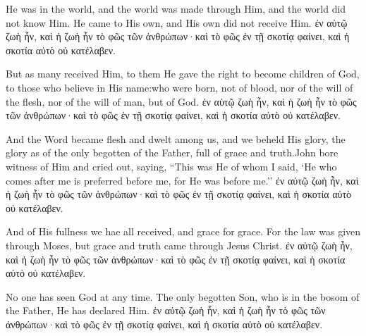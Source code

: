 \newpage

\begin{paracol}{2}
    He was in the world, and the world was made through Him, and the world did not know Him.
    He came to His own, and His own did not receive Him.
\switchcolumn
 ἐν αὐτῷ ζωὴ ἦν, καὶ ἡ ζωὴ ἦν τὸ φῶς τῶν ἀνθρώπων·καὶ τὸ φῶς ἐν τῇ σκοτίᾳ φαίνει, καὶ ἡ σκοτία αὐτὸ οὐ κατέλαβεν.
\end{paracol}

\newpage

\begin{paracol}{2}
But as many received Him, to them He gave the right to become children of God, to those who believe in His name:who were born, not of blood, nor of the will of the flesh, nor of the will of man, but of God.
\switchcolumn
 ἐν αὐτῷ ζωὴ ἦν, καὶ ἡ ζωὴ ἦν τὸ φῶς τῶν ἀνθρώπων·καὶ τὸ φῶς ἐν τῇ σκοτίᾳ φαίνει, καὶ ἡ σκοτία αὐτὸ οὐ κατέλαβεν.
\end{paracol}

\newpage

\begin{paracol}{2}
And the Word became flesh and dwelt among us, and we beheld His glory, the glory as of the only begotten of the Father, full of grace and truth.John bore witness of Him and cried out, saying, ``This was He of whom I said, `He who comes after me is preferred before me, for He was before me.''
\switchcolumn
 ἐν αὐτῷ ζωὴ ἦν, καὶ ἡ ζωὴ ἦν τὸ φῶς τῶν ἀνθρώπων·καὶ τὸ φῶς ἐν τῇ σκοτίᾳ φαίνει, καὶ ἡ σκοτία αὐτὸ οὐ κατέλαβεν.
\end{paracol}

\newpage

\begin{paracol}{2}
And of His fullness we hae all received, and grace for grace. For the law was given through Moses, but grace and truth came through Jesus Christ.
\switchcolumn
 ἐν αὐτῷ ζωὴ ἦν, καὶ ἡ ζωὴ ἦν τὸ φῶς τῶν ἀνθρώπων·καὶ τὸ φῶς ἐν τῇ σκοτίᾳ φαίνει, καὶ ἡ σκοτία αὐτὸ οὐ κατέλαβεν.
\end{paracol}

\newpage

\begin{paracol}{2}
No one has seen God at any time. The only begotten Son, who is in the bosom of the Father, He has declared Him.
\switchcolumn
 ἐν αὐτῷ ζωὴ ἦν, καὶ ἡ ζωὴ ἦν τὸ φῶς τῶν ἀνθρώπων·καὶ τὸ φῶς ἐν τῇ σκοτίᾳ φαίνει, καὶ ἡ σκοτία αὐτὸ οὐ κατέλαβεν.
\end{paracol}



